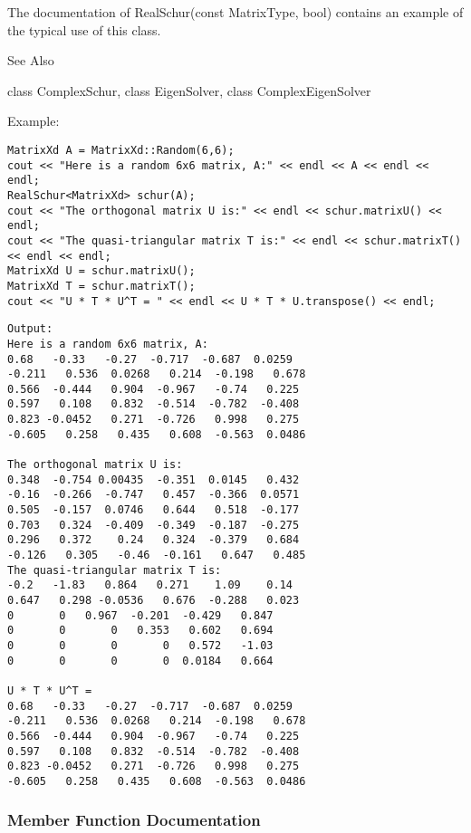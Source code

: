 The documentation of RealSchur(const MatrixType, bool) contains an example of the typical use of this class.

See Also

class ComplexSchur, class EigenSolver, class ComplexEigenSolver 


Example:
\begin{lstlisting}
MatrixXd A = MatrixXd::Random(6,6);
cout << "Here is a random 6x6 matrix, A:" << endl << A << endl << endl;
RealSchur<MatrixXd> schur(A);
cout << "The orthogonal matrix U is:" << endl << schur.matrixU() << endl;
cout << "The quasi-triangular matrix T is:" << endl << schur.matrixT() << endl << endl;
MatrixXd U = schur.matrixU();
MatrixXd T = schur.matrixT();
cout << "U * T * U^T = " << endl << U * T * U.transpose() << endl;
\end{lstlisting}

\begin{verbatim}
Output:
Here is a random 6x6 matrix, A:
0.68   -0.33   -0.27  -0.717  -0.687  0.0259
-0.211   0.536  0.0268   0.214  -0.198   0.678
0.566  -0.444   0.904  -0.967   -0.74   0.225
0.597   0.108   0.832  -0.514  -0.782  -0.408
0.823 -0.0452   0.271  -0.726   0.998   0.275
-0.605   0.258   0.435   0.608  -0.563  0.0486

The orthogonal matrix U is:
0.348  -0.754 0.00435  -0.351  0.0145   0.432
-0.16  -0.266  -0.747   0.457  -0.366  0.0571
0.505  -0.157  0.0746   0.644   0.518  -0.177
0.703   0.324  -0.409  -0.349  -0.187  -0.275
0.296   0.372    0.24   0.324  -0.379   0.684
-0.126   0.305   -0.46  -0.161   0.647   0.485
The quasi-triangular matrix T is:
-0.2   -1.83   0.864   0.271    1.09    0.14
0.647   0.298 -0.0536   0.676  -0.288   0.023
0       0   0.967  -0.201  -0.429   0.847
0       0       0   0.353   0.602   0.694
0       0       0       0   0.572   -1.03
0       0       0       0  0.0184   0.664

U * T * U^T = 
0.68   -0.33   -0.27  -0.717  -0.687  0.0259
-0.211   0.536  0.0268   0.214  -0.198   0.678
0.566  -0.444   0.904  -0.967   -0.74   0.225
0.597   0.108   0.832  -0.514  -0.782  -0.408
0.823 -0.0452   0.271  -0.726   0.998   0.275
-0.605   0.258   0.435   0.608  -0.563  0.0486
\end{verbatim}

\subsubsection{Member Function Documentation}

